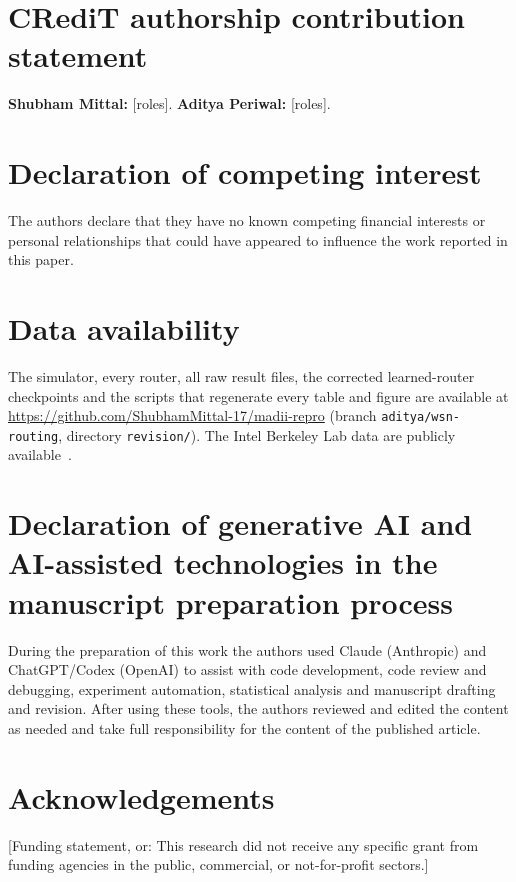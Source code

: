 
\section*{CRediT authorship contribution statement}
\textbf{Shubham Mittal:} [roles]. \textbf{Aditya Periwal:} [roles].

\section*{Declaration of competing interest}
The authors declare that they have no known competing financial interests or personal relationships that could have appeared to influence the work reported in this paper.

\section*{Data availability}
The simulator, every router, all raw result files, the corrected learned-router checkpoints and the scripts that regenerate every table and figure are available at \url{https://github.com/ShubhamMittal-17/madii-repro} (branch \texttt{aditya/wsn-routing}, directory \texttt{revision/}). The Intel Berkeley Lab data are publicly available~\cite{intellab2004}.

\section*{Declaration of generative AI and AI-assisted technologies in the manuscript preparation process}
During the preparation of this work the authors used Claude (Anthropic) and ChatGPT/Codex (OpenAI) to assist with code development, code review and debugging, experiment automation, statistical analysis and manuscript drafting and revision. After using these tools, the authors reviewed and edited the content as needed and take full responsibility for the content of the published article.

\section*{Acknowledgements}
[Funding statement, or: This research did not receive any specific grant from funding agencies in the public, commercial, or not-for-profit sectors.]
